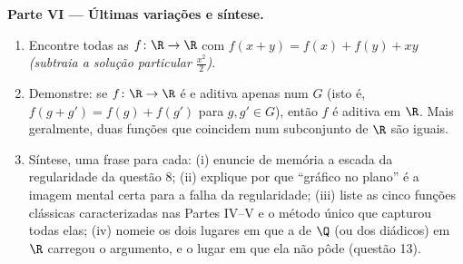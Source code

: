 \begin{problem}[{Problema de fim de semana --- $f(x + y) = f(x) + f(y)$:
a regularidade força a linearidade, e o retrato dos monstros}]
\medskip
\noindent\textbf{Parte VI --- Últimas variações e síntese.}
\begin{enumerate}
  \item Encontre todas as $f \colon \R \to \R$  com $f(x + y)
        = f(x) + f(y) + xy$ \emph{(subtraia a solução particular
        $\frac{x^2}{2}$)}.
  \item Demonstre: se $f \colon \R \to \R$ é  e
        aditiva apenas num \emph{ } $G$ (isto é,
        $f(g + g') = f(g) + f(g')$ para $g, g' \in G$), então $f$
        é aditiva em $\R$. Mais geralmente, duas funções 
        que coincidem num subconjunto  de $\R$ são
        iguais.
  \item Síntese, uma frase para cada: (i) enuncie de memória a
        escada da regularidade da questão 8; (ii) explique por que
        ``gráfico  no plano'' é a imagem mental certa
        para a falha da regularidade; (iii) liste as cinco
        funções clássicas caracterizadas nas Partes IV--V e o
        método único que capturou todas elas; (iv) nomeie os dois
        lugares em que a  de $\Q$ (ou dos diádicos) em $\R$
        carregou o argumento, e o lugar em que ela não pôde
        (questão 13).
\end{enumerate}
\end{problem}
